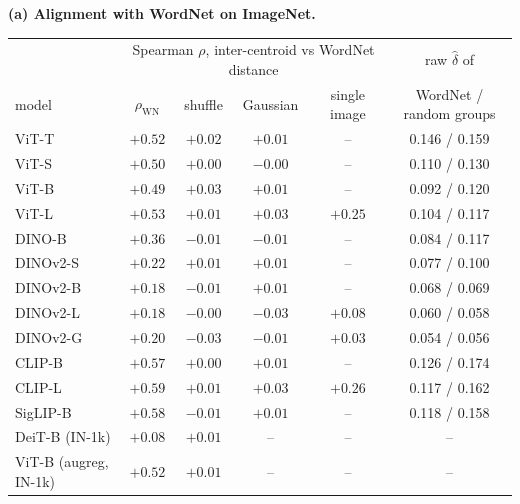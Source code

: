 \begin{table}[tbp]
\centering
\scriptsize
\setlength{\tabcolsep}{2.6pt}
\begingroup
\noindent\textbf{(a) Alignment with WordNet on ImageNet.}\par\vspace{1.5pt}
\footnotesize
\setlength{\tabcolsep}{4pt}
\begin{tabular}{lcccc|c}
\toprule
 & \multicolumn{4}{c|}{Spearman $\rho$, inter-centroid vs WordNet distance} & raw $\hat\delta$ of \\
model & $\rho_{\text{WN}}$ & shuffle & Gaussian & single image & WordNet / random groups \\
\midrule
ViT-T & $+0.52$ & $+0.02$ & $+0.01$ & -- & 0.146 / 0.159 \\
ViT-S & $+0.50$ & $+0.00$ & $-0.00$ & -- & 0.110 / 0.130 \\
ViT-B & $+0.49$ & $+0.03$ & $+0.01$ & -- & 0.092 / 0.120 \\
ViT-L & $+0.53$ & $+0.01$ & $+0.03$ & $+0.25$ & 0.104 / 0.117 \\
\midrule
DINO-B & $+0.36$ & $-0.01$ & $-0.01$ & -- & 0.084 / 0.117 \\
DINOv2-S & $+0.22$ & $+0.01$ & $+0.01$ & -- & 0.077 / 0.100 \\
DINOv2-B & $+0.18$ & $-0.01$ & $+0.01$ & -- & 0.068 / 0.069 \\
DINOv2-L & $+0.18$ & $-0.00$ & $-0.03$ & $+0.08$ & 0.060 / 0.058 \\
DINOv2-G & $+0.20$ & $-0.03$ & $-0.01$ & $+0.03$ & 0.054 / 0.056 \\
\midrule
CLIP-B & $+0.57$ & $+0.00$ & $+0.01$ & -- & 0.126 / 0.174 \\
CLIP-L & $+0.59$ & $+0.01$ & $+0.03$ & $+0.26$ & 0.117 / 0.162 \\
SigLIP-B & $+0.58$ & $-0.01$ & $+0.01$ & -- & 0.118 / 0.158 \\
\midrule
DeiT-B (IN-1k) & $+0.08$ & $+0.01$ & -- & -- & -- \\
ViT-B (augreg, IN-1k) & $+0.52$ & $+0.01$ & -- & -- & -- \\
\bottomrule
\end{tabular}
\par\vspace{5pt}
\endgroup

\end{table}
